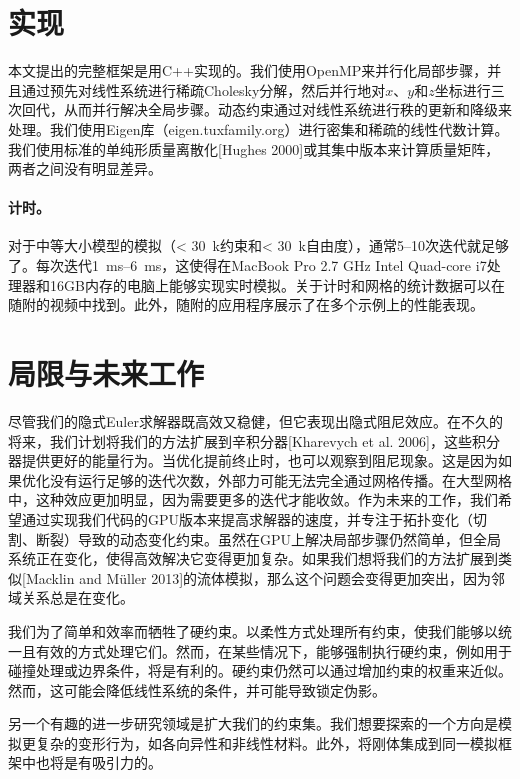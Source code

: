\begin{translation}
\section{实现}

本文提出的完整框架是用C++实现的。我们使用OpenMP来并行化局部步骤，并且通过预先对线性系统进行稀疏Cholesky分解，然后并行地对$x$、$y$和$z$坐标进行三次回代，从而并行解决全局步骤。动态约束通过对线性系统进行秩的更新和降级来处理。我们使用Eigen库（eigen.tuxfamily.org）进行密集和稀疏的线性代数计算。我们使用标准的单纯形质量离散化[Hughes 2000]或其集中版本来计算质量矩阵，两者之间没有明显差异。

\paragraph{计时。}

对于中等大小模型的模拟（\SI{< 30}{k}约束和\SI{< 30}{k}自由度），通常\numrange{5}{10}次迭代就足够了。每次迭代\qtyrange{1}{6}{\milli\second}，这使得在MacBook Pro 2.7 GHz Intel Quad-core i7处理器和16GB内存的电脑上能够实现实时模拟。关于计时和网格的统计数据可以在随附的视频中找到。此外，随附的应用程序展示了在多个示例上的性能表现。

\section{局限与未来工作}

尽管我们的隐式Euler求解器既高效又稳健，但它表现出隐式阻尼效应。在不久的将来，我们计划将我们的方法扩展到辛积分器[Kharevych et al. 2006]，这些积分器提供更好的能量行为。当优化提前终止时，也可以观察到阻尼现象。这是因为如果优化没有运行足够的迭代次数，外部力可能无法完全通过网格传播。在大型网格中，这种效应更加明显，因为需要更多的迭代才能收敛。作为未来的工作，我们希望通过实现我们代码的GPU版本来提高求解器的速度，并专注于拓扑变化（切割、断裂）导致的动态变化约束。虽然在GPU上解决局部步骤仍然简单，但全局系统正在变化，使得高效解决它变得更加复杂。如果我们想将我们的方法扩展到类似[Macklin and Müller 2013]的流体模拟，那么这个问题会变得更加突出，因为邻域关系总是在变化。

我们为了简单和效率而牺牲了硬约束。以柔性方式处理所有约束，使我们能够以统一且有效的方式处理它们。然而，在某些情况下，能够强制执行硬约束，例如用于碰撞处理或边界条件，将是有利的。硬约束仍然可以通过增加约束的权重来近似。然而，这可能会降低线性系统的条件，并可能导致锁定伪影。

另一个有趣的进一步研究领域是扩大我们的约束集。我们想要探索的一个方向是模拟更复杂的变形行为，如各向异性和非线性材料。此外，将刚体集成到同一模拟框架中也将是有吸引力的。


\end{translation}
